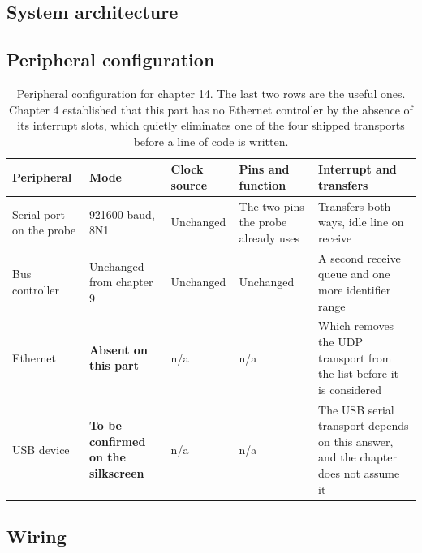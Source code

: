 \subsection*{System architecture}


\subsection*{Peripheral configuration}

\begin{table}[H]\centering\small
\begin{tabular}{p{22mm}p{26mm}p{24mm}p{30mm}p{30mm}}
\toprule
Peripheral & Mode & Clock source & Pins and function & Interrupt and transfers \\
\midrule
Serial port on the probe & 921600 baud, 8N1 & Unchanged & The two pins the probe
already uses & Transfers both ways, idle line on receive \\
Bus controller & Unchanged from chapter 9 & Unchanged & Unchanged & A second
receive queue and one more identifier range \\
Ethernet & \textbf{Absent on this part} & n/a & n/a & Which removes the UDP
transport from the list before it is considered \\
USB device & \textbf{To be confirmed on the silkscreen} & n/a & n/a & The USB
serial transport depends on this answer, and the chapter does not assume it \\
\bottomrule
\end{tabular}
\caption{Peripheral configuration for chapter 14. The last two rows are the useful ones. Chapter 4 established that this part has no Ethernet controller by the absence of its interrupt slots, which quietly eliminates one of the four shipped transports before a line of code is written.}
\end{table}

\subsection*{Wiring}

